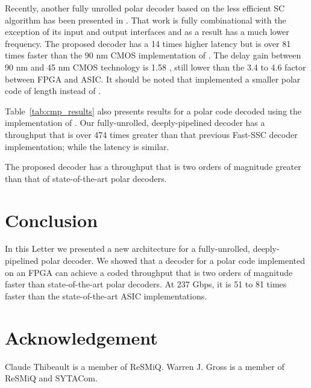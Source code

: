 \documentclass[letterpaper,onecolumn,journal,12pt]{IEEEtran}
\begin{document}
Recently, another fully unrolled polar decoder based on the less efficient SC algorithm has been presented in \cite{Dizdar2014}. That work is fully combinational with the exception of its input and output interfaces and as a result has a much lower frequency. The proposed decoder has a 14 times higher latency but is over 81 times faster than the 90 nm CMOS implementation of \cite{Dizdar2014}. The delay gain between 90 nm and 45 nm CMOS technology is 1.58 \cite{Wong2011}, still lower than the 3.4 to 4.6 factor between FPGA and ASIC. It should be noted that \cite{Dizdar2014} implemented a smaller polar code of length  instead of .

Table~\ref{tab:cmp_results} also presents results for a  polar code decoded using the implementation of \cite{Sarkis2014}. Our fully-unrolled, deeply-pipelined decoder has a throughput that is over 474 times greater than that previous Fast-SSC decoder implementation; while the latency is similar.

The proposed decoder has a throughput that is two orders of magnitude greater than that of state-of-the-art polar decoders.

\section{Conclusion}
In this Letter we presented a new architecture for a fully-unrolled,
deeply-pipelined polar decoder. We showed that a decoder for a 
polar code implemented on an FPGA can achieve a coded throughput that is two
orders of magnitude faster than state-of-the-art polar decoders. At 237 Gbps, it is 51 to 81 times faster than the state-of-the-art ASIC implementations.

\section*{Acknowledgement}
Claude Thibeault is a member of ReSMiQ. Warren J. Gross is a member of ReSMiQ and SYTACom.



\end{document}
